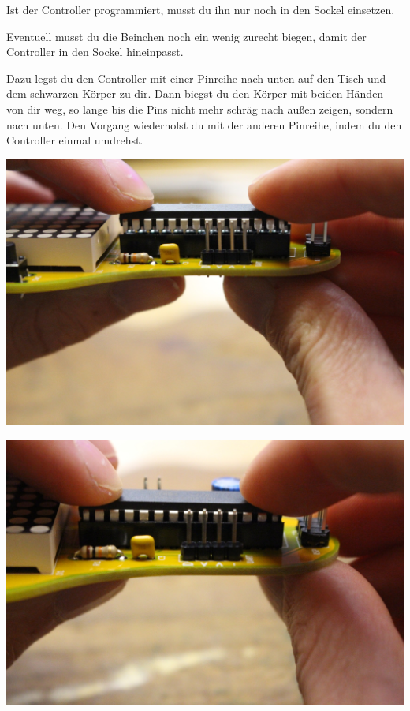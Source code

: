 \documentclass{article}
\begin{document}
Ist der Controller programmiert, musst du ihn nur noch in den Sockel einsetzen.

Eventuell musst du die Beinchen noch ein wenig zurecht biegen, damit der Controller in den Sockel hineinpasst. 

Dazu legst du den Controller mit einer Pinreihe nach unten auf den Tisch und dem schwarzen Körper zu dir. Dann biegst du den Körper mit beiden Händen von dir weg, so lange bis die Pins nicht mehr schräg nach außen zeigen, sondern nach unten.
Den Vorgang wiederholst du mit der anderen Pinreihe, indem du den Controller einmal umdrehst.

\vspace{1cm}

\begin{minipage}[b]{0.5\textwidth}
	\includegraphics[width=\textwidth]{Bilder/IMG_5620.JPG}
\end{minipage}
\begin{minipage}[b]{0.5\textwidth}
	\includegraphics[width=\textwidth]{Bilder/IMG_5622.JPG}
\end{minipage}
\end{document}
